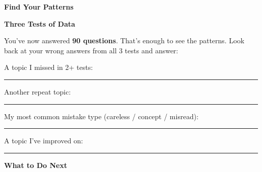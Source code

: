 \clearpage
\thispagestyle{empty}
{\sffamily

\begin{center}
{\fontsize{22}{26}\selectfont\bfseries\color{funOrange} \faSearchPlus\hspace{3mm}Find Your Patterns\hspace{3mm}\faSearchPlus}

\vspace{2mm}
{\color{funGray}\hrulefill}
\end{center}

\vspace{3mm}

\begin{tcolorbox}[
    enhanced,
    colback=funOrangeLight,
    colframe=funOrange!50,
    arc=10pt,
    boxrule=1.5pt,
    left=6mm, right=6mm, top=5mm, bottom=5mm,
]
{\large\bfseries\color{funOrangeDark} \faFingerprint\hspace{2mm}Three Tests of Data}

\vspace{2mm}

You've now answered \textbf{90 questions}. That's enough to see the patterns. Look back at your wrong answers from all 3 tests and answer:

\vspace{3mm}

\faArrowRight\hspace{2mm}A topic I missed in 2+ tests: \rule[-2pt]{5cm}{0.5pt}

\vspace{2mm}

\faArrowRight\hspace{2mm}Another repeat topic: \rule[-2pt]{5.5cm}{0.5pt}

\vspace{2mm}

\faArrowRight\hspace{2mm}My most common mistake type (careless / concept / misread): \rule[-2pt]{2.5cm}{0.5pt}

\vspace{2mm}

\faArrowRight\hspace{2mm}A topic I've improved on: \rule[-2pt]{5cm}{0.5pt}
\end{tcolorbox}

\vspace{3mm}

\begin{tcolorbox}[
    enhanced,
    colback=funYellowLight,
    colframe=funYellow!60,
    arc=10pt,
    boxrule=1pt,
    left=6mm, right=6mm, top=4mm, bottom=4mm,
]
{\bfseries\color{funYellowDark} \faLightbulb\hspace{2mm}What to Do Next}


\end{tcolorbox}}
